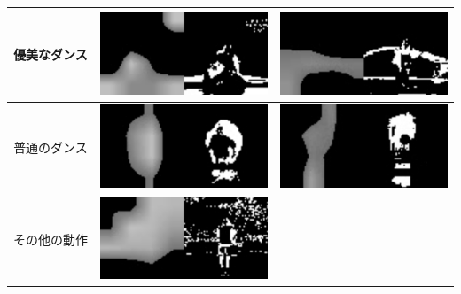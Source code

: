 \begin{table}[t]
  \begin{center}
    \begin{tabular}{|c|c|c|} \hline
      \begin{minipage}[b]{3cm}
        \centering
        優美なダンス
        \vspace*{1cm}
      \end{minipage}
        & \includegraphics[width=50mm]{images/cam/chinese.png}
        & \includegraphics[width=50mm]{images/cam/japanese.png}
      \\ \hline
      \begin{minipage}[b]{3cm}
        \centering
        普通のダンス
        \vspace*{1cm}
      \end{minipage}
        & \includegraphics[width=50mm]{images/cam/kadokawa.png}
        & \includegraphics[width=50mm]{images/cam/aito.png}
      \\ \hline
      \begin{minipage}[b]{3cm}
        \centering
        その他の動作
        \vspace*{1cm}
      \end{minipage}
        & \includegraphics[width=50mm]{images/cam/radio.png}

\end{tabular}
\end{center}
\end{table}

